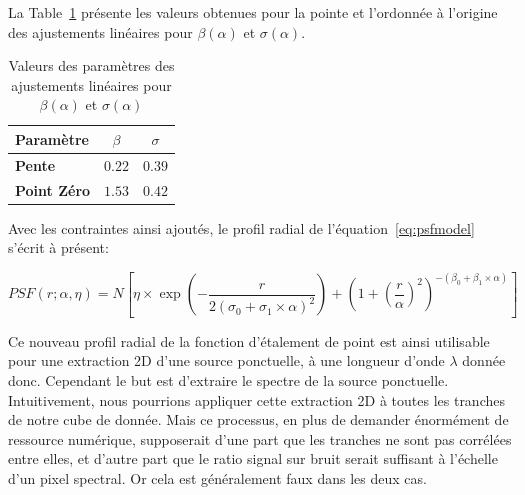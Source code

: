 \documentclass[../main/main.tex]{subfiles}
\begin{document}
La Table~\ref{tab:betasigmapsf} présente les valeurs
obtenues pour la pointe et l'ordonnée à l'origine des ajustements
linéaires pour $\beta(\alpha)$ et $\sigma(\alpha)$. 

\begin{table}[ht]
  \centerfloat
  \renewcommand{\arraystretch}{1.5}
  \caption{Valeurs des paramètres des ajustements linéaires pour
    $\beta(\alpha)$ et $\sigma(\alpha)$}
  \label{tab:betasigmapsf}
    \begin{threeparttable}
        \begin{tabular}{lcc}
        \toprule
          \textbf{Paramètre} & $\beta$  & $\sigma$ \\
        \midrule
          \textbf{Pente} & $0.22$  &  $0.39$  \\
          \textbf{Point Zéro} & $1.53$  & $0.42$    \\
          
          \bottomrule
        \end{tabular}
    \end{threeparttable}
\end{table}

Avec les contraintes ainsi ajoutés, le profil radial de
l'équation~\ref{eq:psfmodel} s'écrit à présent:

\begin{equation}
  \label{eq:psfmodelconstraint}
  PSF(r; \alpha, \eta) = N\left[\eta\times\exp\left(- \frac{r}{2(\sigma_{0}+\sigma_{1}\times\alpha)^{2}}\right) +
    \left( 1+\left( \frac{r}{\alpha}\right)^{2}\right)^{-(\beta_{0}+\beta_{1}\times\alpha)} \right]
\end{equation}

Ce nouveau profil radial de la fonction d'étalement de point est ainsi
utilisable pour une extraction 2D d'une source ponctuelle, à une
longueur d'onde $\lambda$ donnée donc. Cependant le but est d'extraire
le spectre de la source ponctuelle. Intuitivement, nous pourrions
appliquer cette extraction 2D à toutes les tranches de notre cube de
donnée. Mais ce processus, en plus de demander énormément de ressource
numérique, supposerait d'une part que les tranches ne sont pas corrélées
entre elles, et d'autre part que le ratio signal sur bruit serait
suffisant à l'échelle d'un pixel spectral. Or cela est généralement faux
dans les deux cas.
\end{document}
